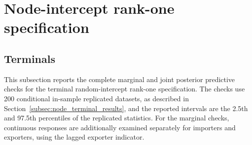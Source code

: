 \documentclass[pdftex,12pt,openright,a4paper,oneside]{book}
\begin{document}
\section{Node-intercept rank-one specification}
\label{app:ppc_node_intercept}

\subsection{Terminals}
This subsection reports the complete marginal and joint posterior predictive checks 
for the terminal random-intercept rank-one specification. The checks use 200 conditional in-sample replicated datasets, 
as described in Section~\ref{subsec:node_terminal_results}, and the reported intervals are the 2.5th and 97.5th percentiles 
of the replicated statistics. For the marginal checks, continuous responses are additionally examined separately for importers and exporters, using the lagged exporter indicator.
\end{document}
